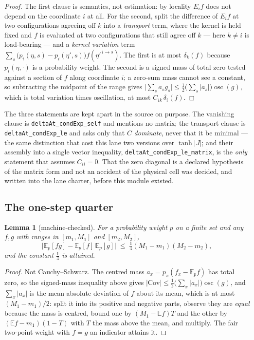 \documentclass[11pt]{article}
\newtheorem{lemma}[theorem]{Lemma}
\theoremstyle{definition}
\begin{document}
\begin{proof}
The first clause is semantics, not estimation: by locality $E_if$ does not
depend on the coordinate $i$ at all.  For the second, split the difference of
$E_if$ at two configurations agreeing off $k$ into a \emph{transport} term,
where the kernel is held fixed and $f$ is evaluated at two configurations that
still agree off $k$ --- here $k\ne i$ is load-bearing --- and a \emph{kernel
variation} term $\sum_s\bigl(p_i(\eta,s)-p_i(\eta',s)\bigr)f(\eta'^{\,i\to s})$.
The first is at most $\delta_k(f)$ because $p_i(\eta,\cdot)$ is a probability
weight.  The second is a signed mass of total zero tested against a section of
$f$ along coordinate $i$; a zero-sum mass cannot see a constant, so subtracting
the midpoint of the range gives
$\bigl|\sum_s a_s g_s\bigr|\le\tfrac12\bigl(\sum_s|a_s|\bigr)\operatorname{osc}(g)$,
which is total variation times oscillation, at most
$C_{ik}\,\delta_i(f)$.
\end{proof}

The three statements are kept apart in the source on purpose.  The vanishing
clause is \texttt{deltaAt\_condExp\_self} and mentions no matrix; the transport
clause is \texttt{deltaAt\_condExp\_le} and asks only that $C$ \emph{dominate},
never that it be minimal --- the same distinction that cost this lane two
versions over $\tanh|J|$; and their assembly into a single vector inequality,
\texttt{deltaAt\_condExp\_le\_matrix}, is the \emph{only} statement that assumes
$C_{ii}=0$.  That the zero diagonal is a declared hypothesis of the matrix form
and not an accident of the physical cell was decided, and written into the lane
charter, before this module existed.

\subsection{The one-step quarter}

\begin{lemma}[machine-checked]
\label{lem:gruss}
For a probability weight $p$ on a finite set and any $f,g$ with ranges in
$[m_1,M_1]$ and $[m_2,M_2]$,
\[
  \bigl|\mathbb{E}_p[fg]-\mathbb{E}_p[f]\,\mathbb{E}_p[g]\bigr|
  \;\le\;\tfrac14(M_1-m_1)(M_2-m_2),
\]
and the constant $\tfrac14$ is attained.
\end{lemma}

\begin{proof}
Not Cauchy--Schwarz.  The centred mass $a_x=p_x(f_x-\mathbb{E}_p f)$ has total
zero, so the signed-mass inequality above gives
$|\mathrm{Cov}|\le\tfrac12\bigl(\sum_x|a_x|\bigr)\operatorname{osc}(g)$, and
$\sum_x|a_x|$ is the mean absolute deviation of $f$ about its mean, which is at
most $(M_1-m_1)/2$: split it into its positive and negative parts, observe they
are \emph{equal} because the mass is centred, bound one by $(M_1-\mathbb{E}f)T$
and the other by $(\mathbb{E}f-m_1)(1-T)$ with $T$ the mass above the mean, and
multiply.  The fair two-point weight with $f=g$ an indicator attains it.
\end{proof}
\end{document}
